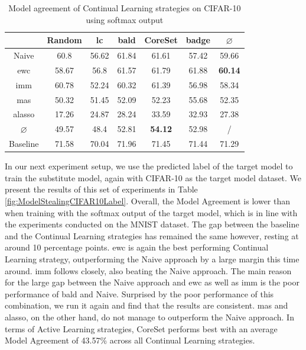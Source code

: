 \begin{table}[h]
    \centering
    \begin{tabular}{ c | c c c c c | c } 
         & Random & \gls{lc} & \gls{bald} & CoreSet & \gls{badge} & $\varnothing$\\ 
        \hline 
        Naive & 60.8 & 56.62 & 61.84 & 61.61 & 57.42 & 59.66 \\
        \gls{ewc} & 58.67 & 56.8 & 61.57 & 61.79 & 61.88 & \textbf{60.14}\\
        \gls{imm} & 60.78 & 52.24 & 60.32 & 61.39 & 56.98 & 58.34 \\
        \gls{mas} & 50.32 & 51.45 & 52.09 & 52.23 & 55.68 & 52.35\\
        \gls{alasso} & 17.26 & 24.87 & 28.24 & 33.59 & 32.93 & 27.38\\
        \hline
        $\varnothing$ & 49.57 & 48.4 & 52.81 & \textbf{54.12} & 52.98 & /\\
        Baseline & 71.58 & 70.04 & 71.96 & 71.45 & 71.44 & 71.29\\
    \end{tabular}
    \caption{Model agreement of Continual Learning strategies on CIFAR-10 using softmax output}
    \label{fig:ModelStealingCIFAR10Softmax}
\end{table}

In our next experiment setup, we use the predicted label of the target model to train the substitute model, again with CIFAR-10 as the target model dataset. We present the results of this set of experiments in Table \ref{fig:ModelStealingCIFAR10Label}. Overall,
the Model Agreement is lower than when training with the softmax output of the target model, which is in line with the experiments conducted on the MNIST dataset. The gap between the baseline and the Continual Learning strategies has remained the same however,
resting at around 10 percentage points. \gls{ewc} is again the best performing Continual Learning strategy, outperforming the Naive approach by a large margin this time around. \gls{imm} follows closely, also beating the Naive approach. The main reason for the large gap
between the Naive approach and \gls{ewc} as well as \gls{imm} is the poor performance of \gls{bald} and Naive. Surprised by the poor performance of this combination, we run it again and find that the results are consistent. \gls{mas} and \gls{alasso}, on the other hand, do not manage to
outperform the Naive approach. In terms of Active Learning strategies, CoreSet performs best with an average Model Agreement of 43.57\% across all Continual Learning strategies. \par

